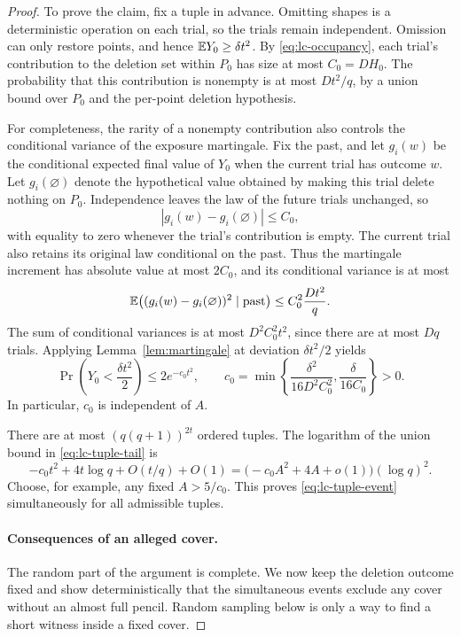 \begin{proof}
To prove the claim, fix a tuple in advance. Omitting shapes is a
deterministic operation on each trial, so the trials remain
independent. Omission can only restore points, and hence
$\mathbb E Y_0\geq\delta t^2$. By \eqref{eq:lc-occupancy}, each trial's
contribution to the deletion set within $P_0$ has size at most
$C_0=DH_0$. The probability that this contribution is nonempty is at
most $Dt^2/q$, by a union bound over $P_0$ and the per-point deletion
hypothesis.

For completeness, the rarity of a nonempty contribution also controls
the conditional variance of the exposure martingale. Fix the past,
and let $g_i(w)$ be the conditional expected final value of $Y_0$ when
the current trial has outcome $w$. Let $g_i(\varnothing)$ denote the
hypothetical value obtained by making this trial delete nothing on
$P_0$. Independence leaves the law of the future trials unchanged, so
\[
 |g_i(w)-g_i(\varnothing)|\leq C_0,
\]
with equality to zero whenever the trial's contribution is empty.
The current trial also retains its original law conditional on the
past. Thus the martingale increment has absolute value at most $2C_0$, and
its conditional variance is at most
\[
 \mathbb E\bigl((g_i(w)-g_i(\varnothing))^2\mid\text{past}\bigr)
 \leq C_0^2\frac{Dt^2}{q}.
\]
The sum of conditional variances is at most $D^2C_0^2t^2$, since there
are at most $Dq$ trials. Applying Lemma~\ref{lem:martingale} at deviation
$\delta t^2/2$ yields
\begin{equation}\label{eq:lc-tuple-tail}
 \Pr\left(Y_0<\frac{\delta t^2}{2}\right)
 \leq2e^{-c_0t^2},\qquad
 c_0=\min\left\{\frac{\delta^2}{16D^2C_0^2},
                       \frac{\delta}{16C_0}\right\}>0.
\end{equation}
In particular, $c_0$ is independent of $A$.

There are at most $(q(q+1))^{2t}$ ordered tuples. The logarithm of the
union bound in \eqref{eq:lc-tuple-tail} is
\[
 -c_0t^2+4t\log q+O(t/q)+O(1)
 =\bigl(-c_0A^2+4A+o(1)\bigr)(\log q)^2.
\]
Choose, for example, any fixed $A>5/c_0$. This proves
\eqref{eq:lc-tuple-event} simultaneously for all admissible tuples.

\paragraph{Consequences of an alleged cover.}
The random part of the argument is complete. We now keep the deletion
outcome fixed and show deterministically that the simultaneous events
exclude any cover without an almost full pencil. Random sampling below
is only a way to find a short witness inside a fixed cover.


\end{proof}
